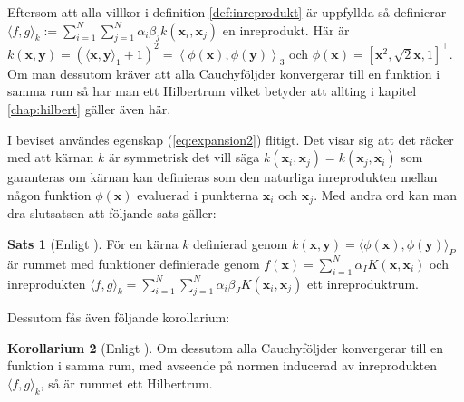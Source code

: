 \documentclass[a4paper, 12pt]{report}
\theoremstyle{definition}
\newtheorem{thm}{Sats}[section]
\newtheorem{cor}[thm]{Korollarium}
\theoremstyle{remark}
\newcommand{\bfx}{\mathbf{x}}
\newcommand{\bfy}{\mathbf{y}}
\begin{document}
\begin{enumerate}

\end{enumerate}
Eftersom att alla villkor i definition \ref{def:inreprodukt} är uppfyllda så definierar $\langle f, g\rangle_k:=\sum_{i=1}^{N}\sum_{j=1}^{N}\alpha_i\beta_jk\left(\bfx_i, \bfx_j\right)$ en inreprodukt. Här är $k\left(\bfx, \bfy\right)=\left(\langle \bfx, \bfy\rangle_1 + 1\right)^2= \left\langle \phi\left(\bfx\right),  \phi\left(\bfy\right)\right\rangle_3$ och $\phi\left(\bfx\right)=\left[\bfx^2, \sqrt{2}\bfx, 1 \right]^\intercal$. Om man dessutom kräver att alla Cauchyföljder konvergerar till en funktion i samma rum så har man ett Hilbertrum vilket betyder att allting i kapitel \ref{chap:hilbert} gäller även här.

I beviset användes egenskap (\ref{eq:expansion2}) flitigt. Det visar sig att det räcker med att kärnan $k$ är symmetrisk det vill säga $k\left(\bfx_i, \bfx_j\right)=k\left(\bfx_j, \bfx_i\right)$ som garanteras om kärnan kan definieras som den naturliga inreprodukten mellan någon funktion $\phi\left(\mathbf{x}\right)$ evaluerad i punkterna $\bfx_i$ och $\bfx_j$. Med andra ord kan man dra slutsatsen att följande sats gäller:
\begin{thm}[Enligt \cite{LearningKernels}]\label{thm:kärnainreprodukt}
	För en kärna $k$ definierad genom $k\left(\bfx, \bfy\right)=\langle \phi\left(\bfx\right), \phi\left(\bfy\right)\rangle_P$ är rummet med funktioner definierade genom $f\left(\bfx\right) = \sum_{i=1}^{N}\alpha_IK\left(\bfx, \bfx_i\right)$ och inreprodukten $\langle f,g\rangle_k = \sum_{i=1}^{N}\sum_{j=1}^{N} \alpha_i\beta_JK\left(\bfx_i, \bfx_j\right)$ ett inreproduktrum.
\end{thm}
Dessutom fås även följande korollarium:
\begin{cor}[Enligt \cite{LearningKernels}]\label{cor:kärnahilbert}
	Om dessutom alla Cauchyföljder konvergerar till en funktion i samma rum, med avseende på normen inducerad av inreprodukten $\langle f, g\rangle_k$, så är rummet ett Hilbertrum.
\end{cor}
\end{document}
